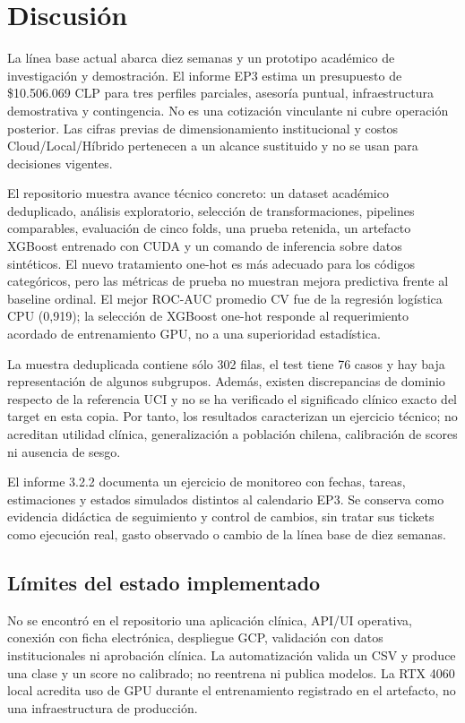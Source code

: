 \section{Discusión}

La línea base actual abarca diez semanas y un prototipo académico de investigación y demostración. El informe EP3 estima un presupuesto de \$10.506.069 CLP para tres perfiles parciales, asesoría puntual, infraestructura demostrativa y contingencia. No es una cotización vinculante ni cubre operación posterior. Las cifras previas de dimensionamiento institucional y costos Cloud/Local/Híbrido pertenecen a un alcance sustituido y no se usan para decisiones vigentes.

El repositorio muestra avance técnico concreto: un dataset académico deduplicado, análisis exploratorio, selección de transformaciones, pipelines comparables, evaluación de cinco folds, una prueba retenida, un artefacto XGBoost entrenado con CUDA y un comando de inferencia sobre datos sintéticos. El nuevo tratamiento one-hot es más adecuado para los códigos categóricos, pero las métricas de prueba no muestran mejora predictiva frente al baseline ordinal. El mejor ROC-AUC promedio CV fue de la regresión logística CPU (0,919); la selección de XGBoost one-hot responde al requerimiento acordado de entrenamiento GPU, no a una superioridad estadística.

La muestra deduplicada contiene sólo 302 filas, el test tiene 76 casos y hay baja representación de algunos subgrupos. Además, existen discrepancias de dominio respecto de la referencia UCI y no se ha verificado el significado clínico exacto del target en esta copia. Por tanto, los resultados caracterizan un ejercicio técnico; no acreditan utilidad clínica, generalización a población chilena, calibración de scores ni ausencia de sesgo.

El informe 3.2.2 documenta un ejercicio de monitoreo con fechas, tareas, estimaciones y estados simulados distintos al calendario EP3. Se conserva como evidencia didáctica de seguimiento y control de cambios, sin tratar sus tickets como ejecución real, gasto observado o cambio de la línea base de diez semanas.

\subsection{Límites del estado implementado}

No se encontró en el repositorio una aplicación clínica, API/UI operativa, conexión con ficha electrónica, despliegue GCP, validación con datos institucionales ni aprobación clínica. La automatización valida un CSV y produce una clase y un score no calibrado; no reentrena ni publica modelos. La RTX 4060 local acredita uso de GPU durante el entrenamiento registrado en el artefacto, no una infraestructura de producción.
